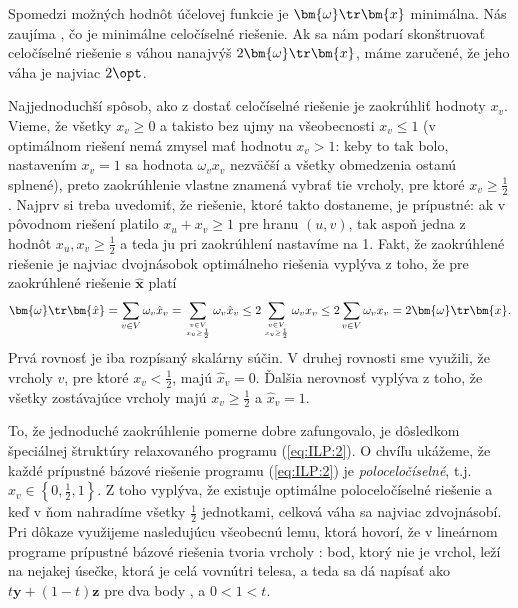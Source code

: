 \noindent Spomedzi možných hodnôt účelovej funkcie je $\bm{\omega}\tr\bm{x}$
minimálna. Nás zaujíma \opt, čo je minimálne celočíselné riešenie. Ak sa nám
podarí skonštruovať celočíselné riešenie s váhou nanajvýš
$2\bm{\omega}\tr\bm{x}$, máme zaručené, že jeho váha je najviac $2\opt$.

\noindent Najjednoduchší spôsob, ako z  dostať celočíselné riešenie je
zaokrúhliť hodnoty $x_v$. Vieme, že všetky $x_v\ge 0$ a takisto bez ujmy na
všeobecnosti $x_v\le 1$ (v optimálnom riešení nemá zmysel mať hodnotu $x_v>1$:
keby to tak bolo, nastavením $x_v=1$ sa hodnota $\omega_vx_v$ nezväčší a
všetky obmedzenia ostanú splnené), preto zaokrúhlenie vlastne znamená vybrať
tie vrcholy, pre ktoré $x_v\ge\frac{1}{2}$.  Najprv si treba uvedomiť, že
riešenie, ktoré takto dostaneme, je prípustné: ak v pôvodnom riešení platilo
$x_u+x_v\ge1$ pre hranu $(u,v)$, tak aspoň jedna z hodnôt
$x_u,x_v\ge\frac{1}{2}$ a teda ju pri zaokrúhlení nastavíme na 1. Fakt, že
zaokrúhlené riešenie je najviac dvojnásobok optimálneho riešenia vyplýva z
toho, že pre zaokrúhlené riešenie $\bm{\hat{x}}$ platí
$$\bm{\omega}\tr\bm{\hat{x}}=\sum_{v\in V}\omega_v\hat{x}_v=\sum_{v\in V\atop
x_v\ge\frac{1}{2}}\omega_v\hat{x}_v \le2\sum_{v\in V\atop
x_v\ge\frac{1}{2}}\omega_v x_v\le2\sum_{v\in
V}\omega_vx_v=2\bm{\omega}\tr\bm{x}.$$ Prvá rovnosť je iba rozpísaný skalárny
súčin. V druhej rovnosti sme využili, že vrcholy $v$, pre ktoré
$x_v<\frac{1}{2}$, majú $\hat{x}_v=0$.  Ďalšia nerovnosť vyplýva z toho, že
všetky zostávajúce vrcholy majú $x_v\ge\frac{1}{2}$ a $\hat{x}_v=1$.


\noindent
To, že jednoduché zaokrúhlenie pomerne dobre zafungovalo, je dôsledkom 
špeciálnej štruktúry relaxovaného programu   (\ref{eq:ILP:2}). O  chvíľu ukážeme, že každé
prípustné bázové riešenie programu (\ref{eq:ILP:2}) je {\em poloceločíselné},
t.j.  $x_v\in\left\{0,\frac{1}{2},1\right\}$. Z toho vyplýva, že existuje
optimálne poloceločíselné riešenie a keď v ňom nahradíme všetky $\frac{1}{2}$
jednotkami, celková váha sa najviac zdvojnásobí. 
Pri dôkaze využijeme nasledujúcu všeobecnú lemu, ktorá hovorí, že v lineárnom 
programe prípustné bázové
riešenia tvoria vrcholy \dom: bod, ktorý nie je vrchol, leží na nejakej úsečke, ktorá
je celá vovnútri telesa, a teda sa dá napísať ako $t\bm{y}+(1-t)\bm{z}$ pre dva body
,  a $0<1<t$.

